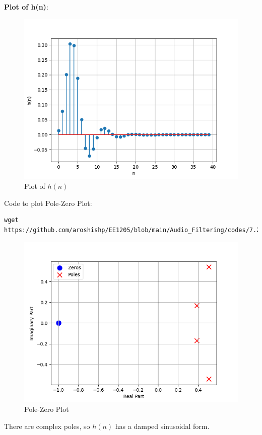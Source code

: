 \documentclass[journal,12pt,twocolumn]{IEEEtran}
\theoremstyle{remark}
\renewcommand\thesection{\arabic{section}}
\numberwithin{equation}{subsection}
\begin{document}
\begin{enumerate}[label=\thesection.\arabic*]
\textbf{Plot of h(n)}:
\begin{figure}[!h]
    \centering
    \includegraphics[width = \columnwidth]{figs/7.2hn.png}
    \caption{Plot of $h(n)$}
    \label{fig:7.2}
\end{figure}

Code to plot Pole-Zero Plot:
\begin{lstlisting}
wget https://github.com/aroshishp/EE1205/blob/main/Audio_Filtering/codes/7.2pole.py
\end{lstlisting}
\begin{figure}[!h]
    \centering
    \includegraphics[width = \columnwidth]{figs/7.2zp.png}
    \caption{Pole-Zero Plot}
    \label{fig:7.2zp}
\end{figure}
There are complex poles, so $h(n)$ has a damped sinusoidal form.\\


\end{enumerate}
\end{document}
